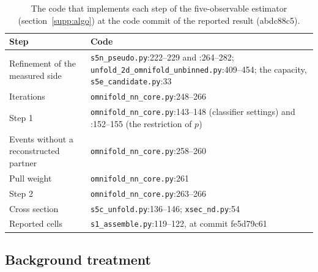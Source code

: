 \begin{table}[htbp]
\centering
\caption{The code that implements each step of the five-observable estimator (section~\ref{supp:algo}) at the code commit of the reported result (abdc88c5).}
\label{tab:codemap}
\small
\begin{tabular}{@{}>{\raggedright\arraybackslash}p{}>{\raggedright\arraybackslash}p{}@{}}
\toprule
Step & Code \\
\midrule
Refinement of the measured side & \texttt{s5n\_pseudo.py}:222--229 and :264--282; \texttt{unfold\_2d\_omnifold\_unbinned.py}:409--454; the capacity, \texttt{s5e\_candidate.py}:33 \\
Iterations & \texttt{omnifold\_nn\_core.py}:248--266 \\
\quad Step 1 & \texttt{omnifold\_nn\_core.py}:143--148 (classifier settings) and :152--155 (the restriction of $p$) \\
\quad Events without a reconstructed partner & \texttt{omnifold\_nn\_core.py}:258--260 \\
\quad Pull weight & \texttt{omnifold\_nn\_core.py}:261 \\
\quad Step 2 & \texttt{omnifold\_nn\_core.py}:263--266 \\
Cross section & \texttt{s5c\_unfold.py}:136--146; \texttt{xsec\_nd.py}:54 \\
Reported cells & \texttt{s1\_assemble.py}:119--122, at commit fe5d79c61 \\
\bottomrule
\end{tabular}
\end{table}

\subsection{Background treatment}
\label{supp:bkg}

